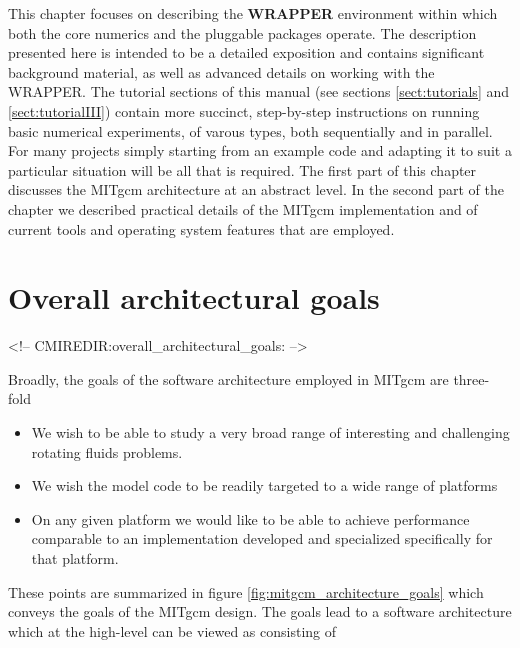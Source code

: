 
This chapter focuses on describing the {\bf WRAPPER} environment
within which both the core numerics and the pluggable packages
operate. The description presented here is intended to be a detailed
exposition and contains significant background material, as well as
advanced details on working with the WRAPPER.  The tutorial sections
of this manual (see sections \ref{sect:tutorials} and
\ref{sect:tutorialIII}) contain more succinct, step-by-step
instructions on running basic numerical experiments, of varous types,
both sequentially and in parallel. For many projects simply starting
from an example code and adapting it to suit a particular situation
will be all that is required.  The first part of this chapter
discusses the MITgcm architecture at an abstract level. In the second
part of the chapter we described practical details of the MITgcm
implementation and of current tools and operating system features that
are employed.

\section{Overall architectural goals}
\begin{rawhtml}
<!-- CMIREDIR:overall_architectural_goals: -->
\end{rawhtml}

Broadly, the goals of the software architecture employed in MITgcm are 
three-fold
 
\begin{itemize}
\item We wish to be able to study a very broad range of interesting
  and challenging rotating fluids problems.
\item We wish the model code to be readily targeted to a wide range of
  platforms
\item On any given platform we would like to be able to achieve
  performance comparable to an implementation developed and
  specialized specifically for that platform.
\end{itemize}

These points are summarized in figure
\ref{fig:mitgcm_architecture_goals} which conveys the goals of the
MITgcm design. The goals lead to a software architecture which at the
high-level can be viewed as consisting of

